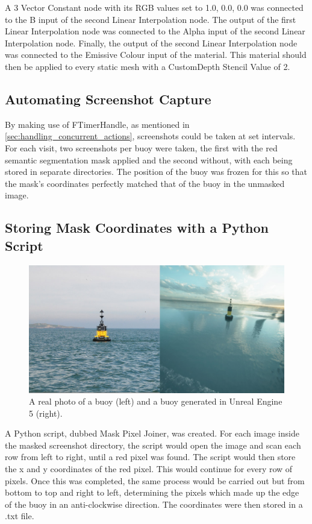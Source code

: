 \documentclass[10pt,twocolumn,letterpaper]{article}
\begin{document}
A 3 Vector Constant node with its RGB values set to 1.0, 0.0, 0.0 was connected to the B input of the second Linear Interpolation node. The output of the first Linear Interpolation node was connected to the Alpha input of the second Linear Interpolation node. Finally, the output of the second Linear Interpolation node was connected to the Emissive Colour input of the material. This material should then be applied to every static mesh with a CustomDepth Stencil Value of 2.

\subsection{Automating Screenshot Capture}

By making use of FTimerHandle, as mentioned in \ref{sec:handling_concurrent_actions}, screenshots could be taken at set intervals. For each visit, two screenshots per buoy were taken, the first with the red semantic segmentation mask applied and the second without, with each being stored in separate directories. The position of the buoy was frozen for this so that the mask's coordinates perfectly matched that of the buoy in the unmasked image.

\subsection{Storing Mask Coordinates with a Python Script} \label {sec:mask_coordinates}

\begin{figure}[t]
    \centering
    \includegraphics[width=\linewidth]{images/buoy-realism-comparison.jpg}
    \caption{A real photo of a buoy (left) and a buoy generated in Unreal Engine 5 (right).}
    \label{fig:buoy_without_mask}
\end{figure}

A Python script, dubbed Mask Pixel Joiner, was created. For each image inside the masked screenshot directory, the script would open the image and scan each row from left to right, until a red pixel was found. The script would then store the x and y coordinates of the red pixel. This would continue for every row of pixels. Once this was completed, the same process would be carried out but from bottom to top and right to left, determining the pixels which made up the edge of the buoy in an anti-clockwise direction. The coordinates were then stored in a .txt file.
\end{document}

